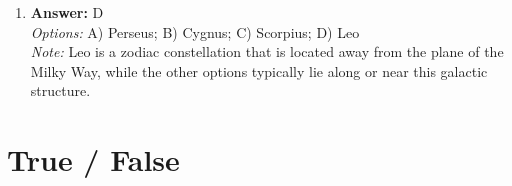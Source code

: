 \documentclass[12pt]{article}
\begin{document}
\begin{enumerate}[label=\arabic*.]
\\ \textit{Note:} The correct answer is based on the principle of differentiation, where denser materials, such as metals, gravitate towards the center of a molten planetary body, leading to metallic cores in terrestrial planets.
\item \textbf{Answer:} D
\\ \textit{Options:} A) Perseus; B) Cygnus; C) Scorpius; D) Leo
\\ \textit{Note:} Leo is a zodiac constellation that is located away from the plane of the Milky Way, while the other options typically lie along or near this galactic structure.
\end{enumerate}

\section*{True / False}
\end{document}
